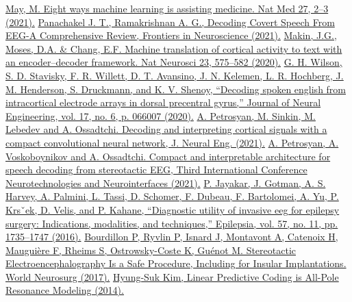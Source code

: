 \documentclass[a4paper,14pt]{extarticle}
\begin{document}
\newpage
\begin{thebibliography}{0}
	\hypertarget{b_1}{}
	\href{https://doi.org/10.1038/s41591-020-01197-2}
	{May, M. Eight ways machine learning is assisting medicine. Nat Med 27, 2–3 (2021).}
	\hypertarget{b_2}{}
	\href{https://www.frontiersin.org/articles/10.3389/fnins.2021.642251/full}
	{Panachakel J. T., Ramakrishnan A. G., Decoding Covert Speech From EEG-A Comprehensive Review, Frontiers in Neuroscience (2021).}
	\hypertarget{b_3}{}
	\href{https://www.nature.com/articles/s41593-020-0608-8}
	{Makin, J.G., Moses, D.A. \& Chang, E.F. Machine translation of cortical activity to text with an encoder–decoder framework. Nat Neurosci 23, 575–582 (2020).}
	\hypertarget{b_4}{}
	\href{https://iopscience.iop.org/article/10.1088/1741-2552/abbfef}
	{G. H. Wilson, S. D. Stavisky, F. R. Willett, D. T. Avansino, J. N. Kelemen, L. R. Hochberg, J. M. Henderson, S. Druckmann, and K. V. Shenoy, “Decoding spoken english from intracortical electrode arrays in dorsal precentral gyrus,” Journal of Neural Engineering, vol. 17, no. 6, p. 066007 (2020).}
	\hypertarget{b_5}{}
	\href{https://iopscience.iop.org/article/10.1088/1741-2552/abe20e}
	{A. Petrosyan, M. Sinkin, M. Lebedev and A. Ossadtchi. Decoding and interpreting cortical signals with a compact convolutional neural network, J. Neural Eng. (2021).}
	\hypertarget{b_6}{}
	\href{https://ieeexplore.ieee.org/document/9580381}
	{A. Petrosyan, A. Voskoboynikov and A. Ossadtchi. Compact and interpretable architecture for speech decoding from stereotactic EEG, Third International Conference Neurotechnologies and Neurointerfaces (2021).}
	\hypertarget{b_7}{}
	\href{https://pubmed.ncbi.nlm.nih.gov/27677490/}
	{P. Jayakar, J. Gotman, A. S. Harvey, A. Palmini, L. Tassi, D. Schomer, F. Dubeau, F. Bartolomei, A. Yu, P. Krsˇek, D. Velis, and P. Kahane, “Diagnostic utility of invasive eeg for epilepsy surgery: Indications, modalities, and techniques,” Epilepsia, vol. 57, no. 11, pp. 1735–1747 (2016).}
	\hypertarget{b_8}{}
	\href{https://pubmed.ncbi.nlm.nih.gov/28003163/}
	{Bourdillon P, Ryvlin P, Isnard J, Montavont A, Catenoix H, Mauguière F, Rheims S, Ostrowsky-Coste K, Guénot M. Stereotactic Electroencephalography Is a Safe Procedure, Including for Insular Implantations. World Neurosurg (2017).}
	\hypertarget{b_9}{}
	\href{https://www.semanticscholar.org/paper/Linear-Predictive-Coding-is-All-Pole-Resonance-Kim/cddfaefa1166fde985bcb7852358fe99a6b0caa8}
	{Hyung-Suk Kim, Linear Predictive Coding is All-Pole Resonance Modeling (2014).}

\end{thebibliography}
\end{document}
